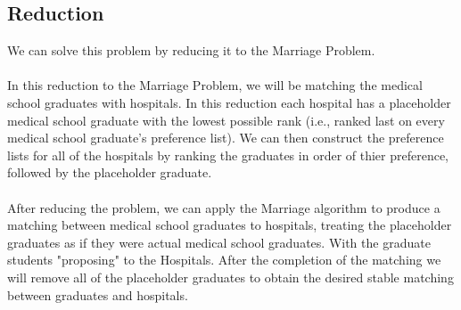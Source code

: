\documentclass{article}
\begin{document}
\subsection{Reduction}
We can solve this problem by reducing it to the Marriage Problem.\\\\
In this reduction to the Marriage Problem, we will be matching the medical school graduates with hospitals. In this reduction each hospital has a placeholder medical school graduate with the lowest possible rank (i.e., ranked last on every medical school graduate's preference list). We can then construct the preference lists for all of the hospitals by ranking the graduates in order of thier preference, followed by the placeholder graduate.\\\\
After reducing the problem, we can apply the Marriage algorithm to produce a matching between medical school graduates to hospitals, treating the placeholder graduates as if they were actual medical school graduates. With the graduate students "proposing" to the Hospitals. After the completion of the matching we will remove all of the placeholder graduates to obtain the desired stable matching between graduates and hospitals.\\\\
\end{document}
